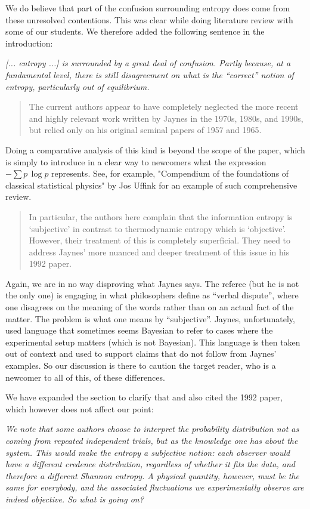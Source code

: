 \documentclass[11pt]{article}
\begin{document}
We do believe that part of the confusion surrounding entropy does come from these unresolved contentions. This was clear while doing literature review with some of our students. We therefore added the following sentence in the introduction:

\emph{[... entropy ...] is surrounded by a great deal of confusion. Partly because, at a fundamental level, there is still disagreement on what is the ``correct'' notion of entropy, particularly out of equilibrium.}

\begin{quote}
The current authors appear to have completely neglected the more recent and highly relevant work written by Jaynes in the 1970s, 1980s, and 1990s, but relied only on his original seminal papers of 1957 and 1965.
\end{quote}

Doing a comparative analysis of this kind is beyond the scope of the paper, which is simply to introduce in a clear way to newcomers what the expression $- \sum p \, \log p$ represents. See, for example, "Compendium of the foundations of classical statistical physics" by Jos Uffink for an example of such comprehensive review.

\begin{quote}
In particular, the authors here complain that the information entropy is ‘subjective’ in contrast to thermodynamic entropy which is ‘objective’. However, their treatment of this is completely superficial. They need to address Jaynes’ more nuanced and deeper treatment of this issue in his 1992 paper.
\end{quote}
Again, we are in no way disproving what Jaynes says. The referee (but he is not the only one) is engaging in what philosophers define as ``verbal dispute'', where one disagrees on the meaning of the words rather than on an actual fact of the matter. The problem is what one means by ``subjective''. Jaynes, unfortunately, used language that sometimes seems Bayesian to refer to cases where the experimental setup matters (which is not Bayesian). This language is then taken out of context and used to support claims that do not follow from Jaynes' examples. So our discussion is there to caution the target reader, who is a newcomer to all of this, of these differences.

We have expanded the section to clarify that and also cited the 1992 paper, which however does not affect our point:

\emph{We note that some authors choose to interpret the probability distribution not as coming from repeated independent trials, but as the knowledge one has about the system. This would make the entropy a subjective notion: each observer would have a different credence distribution, regardless of whether it fits the data, and therefore a different Shannon entropy. A physical quantity, however, must be the same for everybody, and the associated fluctuations we experimentally observe are indeed objective. So what is going on?}
\end{document}
